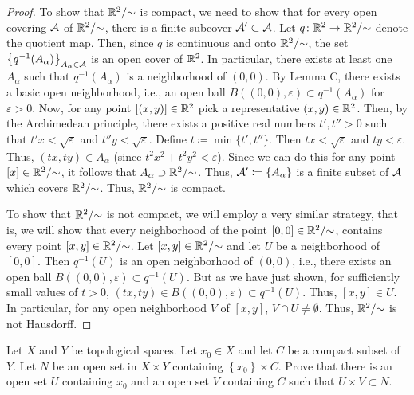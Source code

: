 \begin{proof}
To show that $\mathbb{R}^2/{\sim}$ is compact, we need to show that for every
open covering $\mathcal{A}$ of $\mathbb{R}^2/{\sim}$, there is a finite subcover
$\mathcal{A}'\subset\mathcal{A}$. Let $q\colon\mathbb{R}^2\to\mathbb{R}^2/{\sim}$ denote the
quotient map. Then, since $q$ is continuous and onto $\mathbb{R}^2/{\sim}$, the
set $\left\{q^{-1}(A_\alpha)\right\}_{A_\alpha\in\mathcal{A}}$ is an open cover
of $\mathbb{R}^2$. In particular, there exists at least one $A_\alpha$ such that
$q^{-1}(A_\alpha)$ is a neighborhood of $(0,0)$. By Lemma C, there exists a
basic open neighborhood, i.e., an open ball $B((0,0),\varepsilon)\subset
q^{-1}(A_\alpha)$ for $\varepsilon>0$. Now, for any point
$[(x,y)]\in\mathbb{R}^2$ pick a representative $(x,y)\in\mathbb{R}^2$. Then, by the
Archimedean principle, there exists a positive real numbers $t',t''>0$ such
that $t'x<\sqrt{\varepsilon}$ and $t''y<\sqrt{\varepsilon}$. Define
$t\coloneqq\min\{t',t''\}$. Then $tx<\sqrt{\varepsilon}$ and
$ty<\varepsilon$. Thus, $(tx,ty)\in A_\alpha$ (since
$t^2x^2+t^2y^2<\varepsilon$). Since we can do this for any point
$[x]\in\mathbb{R}^2/{\sim}$, it follows that
$A_\alpha\supset\mathbb{R}^2/{\sim}$. Thus,
$\mathcal{A}'\coloneqq\left\{A_\alpha\right\}$ is a finite subset of $\mathcal{A}$
which covers $\mathbb{R}^2/{\sim}$. Thus, $\mathbb{R}^2/{\sim}$ is compact.

To show that $\mathbb{R}^2/{\sim}$ is not compact, we will employ a very similar
strategy, that is, we will show that every neighborhood of the point
$[0,0]\in\mathbb{R}^2/{\sim}$, contains every point $[x,y]\in\mathbb{R}^2/{\sim}$. Let
$[x,y]\in\mathbb{R}^2/{\sim}$ and let $U$ be a neighborhood of $[0,0]$. Then
$q^{-1}(U)$ is an open neighborhood of $(0,0)$, i.e., there exists an open
ball $B((0,0),\varepsilon)\subset q^{-1}(U)$. But as we have just shown,
for sufficiently small values of $t>0$, $(tx,ty)\in
B((0,0),\varepsilon)\subset q^{-1}(U)$. Thus, $[x,y]\in U$. In particular,
for any open neighborhood $V$ of $[x,y]$, $V\cap U\neq\emptyset$. Thus,
$\mathbb{R}^2/{\sim}$ is not Hausdorff.
\end{proof}
\begin{problem}
Let $X$ and $Y$ be topological spaces. Let $x_0\in X$ and let $C$ be a
compact subset of $Y$. Let $N$ be an open set in $X\times Y$ containing
$\left\{x_0\right\}\times C$. Prove that there is an open set $U$
containing $x_0$ and an open set $V$ containing $C$ such that $U\times
V\subset N$.
\end{problem}
